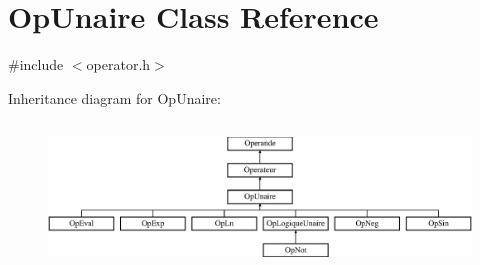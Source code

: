\hypertarget{class_op_unaire}{}\section{Op\+Unaire Class Reference}
\label{class_op_unaire}


{\ttfamily \#include $<$operator.\+h$>$}

Inheritance diagram for Op\+Unaire\+:\begin{figure}[H]
\begin{center}
\leavevmode
\includegraphics[height=3.954802cm]{class_op_unaire}
\end{center}
\end{figure}
